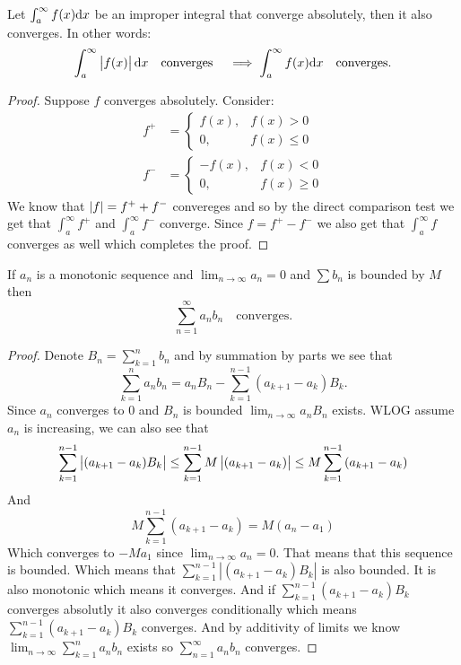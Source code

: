 \documentclass[11pt,a4paper]{article}
\begin{document}
  \begin{proposition}
    Let $\int_a^\infty f(x)\dx$ be an improper integral that 
    converge absolutely, then it also converges.
    In other words:
    \[
      \int_a^\infty \abs{f(x)}\dx \quad\mathrm{converges}\quad
      \implies
      \int_a^\infty {f(x)}\dx \quad\mathrm{converges}.
    \]
  \end{proposition}
  \begin{proof}
    Suppose $f$ converges absolutely. Consider:
    \begin{align*}
      f^+&=
      \begin{cases}
          f(x),  & f(x) > 0 \\
          0,  & f(x) \le 0
      \end{cases} \\
      f^-&=
      \begin{cases}
          -f(x),  & f(x) < 0 \\
          0,  & f(x) \ge 0
      \end{cases}
    \end{align*}
    We know that $\left\lvert f\right\rvert = f^+ + f^-$ convereges and so by the direct 
    comparison test we get that  $\int_{a}^{\infty} f^+$ and 
    $\int_{a}^{\infty} f^-$ converge.
    Since $f = f^+ - f^-$ we also get that $\int_{a}^{\infty} f$ converges 
    as well which completes the proof.
  \end{proof}

  \begin{proposition}
    If $a_n$ is a monotonic sequence and $\lim_{n\to\infty} a_n = 0$ and 
    $\sum b_n$ is bounded by $M$ then
    \[
      \sum_{n=1}^{\infty} a_n b_n \quad\mathrm{ converges}.
    \]
  \end{proposition}
  \begin{proof}
		Denote $B_{n} = \sum_{k=1}^{n}{b_{n}}$ and by summation by parts we see that
		\[
			\sum_{k=1}^{n}{a_{n}b_{n}} =
      a_{n}B_{n} - \sum_{k=1}^{n-1}{(a_{k+1}-a_{k})B_k}.
		\]
		Since $a_{n}$ converges to $0$ and $B_{n}$ is bounded 
		$\lim_{n\to\infty}{a_nB_n}$ exists.
		WLOG assume $a_n$ is increasing, we can also see that
		\[
    \sum_{k=1}^{n-1} \left\lvert(a_{k+1}-a_{k})B_k\right\rvert \le
    \sum_{k=1}^{n-1} M\left\lvert(a_{k+1}-a_{k})\right\rvert \le
			M \sum_{k=1}^{n-1}{(a_{k+1}-a_{k})}
		\] 
		And
		\[
			M \sum_{k=1}^{n-1}{(a_{k+1}-a_{k})} = M(a_{n}-a_{1})
		\]
		Which converges to $-Ma_1$ since $\lim_{n\to\infty}{a_n}=0$.
		That means that this sequence is bounded. Which means that
		$\sum_{k=1}^{n-1}{|(a_{k+1}-a_{k})B_k|}$ is also bounded.
		It is also monotonic which means it converges. And if
		$\sum_{k=1}^{n-1}{(a_{k+1}-a_{k})B_k}$ converges absolutly it also
		converges conditionally which means $\sum_{k=1}^{n-1}{(a_{k+1}-a_{k})B_k}$
		converges. And by additivity of limits we know 
		$\lim_{n\to\infty}\sum_{k=1}^{n}{a_{n}b_{n}}$ exists so 
		$\sum_{n=1}^\infty a_nb_n$ converges.
  \end{proof}
	
\end{document}
